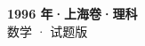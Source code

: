 \documentclass[zihao=-4, a4paper]{ctexart}
\begin{document}
\begin{center}
  {\Large\bfseries 1996 年·上海卷·理科}\\[4pt]
  {\large 数学 · 试题版}
\end{center}
\medskip
{}

\end{document}
